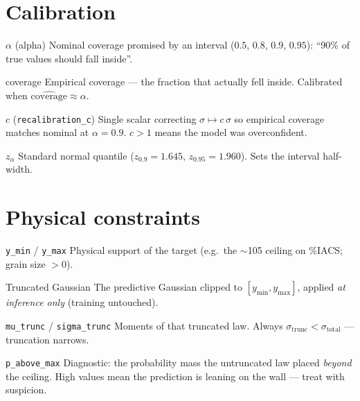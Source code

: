 \documentclass[11pt,a4paper]{article}
\newcommand{\code}[1]{\texttt{\small #1}}
\newenvironment{terms}
  {\begin{description}[style=unboxed,leftmargin=1.2em,itemsep=0.45em,parsep=0pt,
                       font=\normalfont\bfseries]}
  {\end{description}}
\begin{document}
\section{Calibration}

\begin{terms}
  \item[$\alpha$ (alpha)] Nominal coverage promised by an interval
    ($0.5$, $0.8$, $0.9$, $0.95$): ``90\% of true values should fall inside''.

  \item[coverage] Empirical coverage --- the fraction that actually fell
    inside. Calibrated when $\widehat{\text{coverage}} \approx \alpha$.

  \item[$c$ (\code{recalibration\_c})] Single scalar correcting
    $\sigma \mapsto c\,\sigma$ so empirical coverage matches nominal at
    $\alpha = 0.9$. $c > 1$ means the model was overconfident.

  \item[$z_\alpha$] Standard normal quantile ($z_{0.9} = 1.645$,
    $z_{0.95} = 1.960$). Sets the interval half-width.
\end{terms}

\section{Physical constraints}

\begin{terms}
  \item[\code{y\_min} / \code{y\_max}] Physical support of the target
    (e.g.\ the $\sim$105 ceiling on \%IACS; grain size $> 0$).

  \item[Truncated Gaussian] The predictive Gaussian clipped to
    $[y_{\min}, y_{\max}]$, applied \emph{at inference only} (training
    untouched).

  \item[\code{mu\_trunc} / \code{sigma\_trunc}] Moments of that truncated law.
    Always $\sigma_{\text{trunc}} < \sigma_{\text{total}}$ --- truncation
    narrows.

  \item[\code{p\_above\_max}] Diagnostic: the probability mass the untruncated
    law placed \emph{beyond} the ceiling. High values mean the prediction is
    leaning on the wall --- treat with suspicion.
\end{terms}
\end{document}
